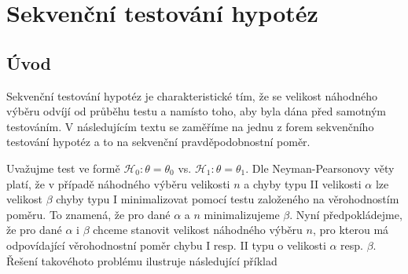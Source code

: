 \section{Sekvenční testování hypotéz}

\subsection{Úvod}

Sekvenční testování hypotéz je charakteristické tím, že se velikost náhodného výběru odvíjí od průběhu testu a namísto toho, aby byla dána před samotným testováním. V následujícím textu se zaměříme na jednu z forem sekvenčního testování hypotéz a to na sekvenční pravděpodobnostní poměr.

Uvažujme test ve formě $\mathscr{H}_0: \theta = \theta_0$ vs. $\mathscr{H}_1: \theta = \theta_1$. Dle Neyman-Pearsonovy věty platí, že v případě náhodného výběru velikosti $n$ a chyby typu II velikosti $\alpha$ lze velikost $\beta$ chyby typu I minimalizovat pomocí testu založeného na věrohodnostím poměru. To znamená, že pro dané $\alpha$ a $n$ minimalizujeme $\beta$. Nyní předpokládejme, že pro dané $\alpha$ i $\beta$ chceme stanovit velikost náhodného výběru $n$, pro kterou má odpovídající věrohodnostní poměr chybu I resp. II typu o velikosti $\alpha$ resp. $\beta$. Řešení takovéhoto problému ilustruje následující příklad

